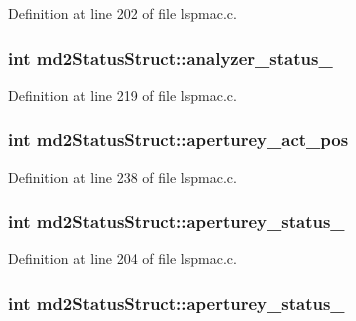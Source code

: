 Definition at line 202 of file lspmac.c.\hypertarget{structmd2StatusStruct_a4f88bb778e4e18f1fbf7672ac11e7433}{
\subsubsection[{analyzer\_\-status\_\-2}]{\setlength{\rightskip}{0pt plus 5cm}int {\bf md2StatusStruct::analyzer\_\-status\_}}}
\label{structmd2StatusStruct_a4f88bb778e4e18f1fbf7672ac11e7433}


Definition at line 219 of file lspmac.c.\hypertarget{structmd2StatusStruct_a2a434d2b57dbb669de0765486a1516ff}{
\subsubsection[{aperturey\_\-act\_\-pos}]{\setlength{\rightskip}{0pt plus 5cm}int {\bf md2StatusStruct::aperturey\_\-act\_\-pos}}}
\label{structmd2StatusStruct_a2a434d2b57dbb669de0765486a1516ff}


Definition at line 238 of file lspmac.c.\hypertarget{structmd2StatusStruct_a2ef953eaddf7058bf4276585e6ff066b}{
\subsubsection[{aperturey\_\-status\_\-1}]{\setlength{\rightskip}{0pt plus 5cm}int {\bf md2StatusStruct::aperturey\_\-status\_}}}
\label{structmd2StatusStruct_a2ef953eaddf7058bf4276585e6ff066b}


Definition at line 204 of file lspmac.c.\hypertarget{structmd2StatusStruct_a0a7738f13a0fa80626cafc2299b104b4}{
\subsubsection[{aperturey\_\-status\_\-2}]{\setlength{\rightskip}{0pt plus 5cm}int {\bf md2StatusStruct::aperturey\_\-status\_}}}
\label{structmd2StatusStruct_a0a7738f13a0fa80626cafc2299b104b4}


